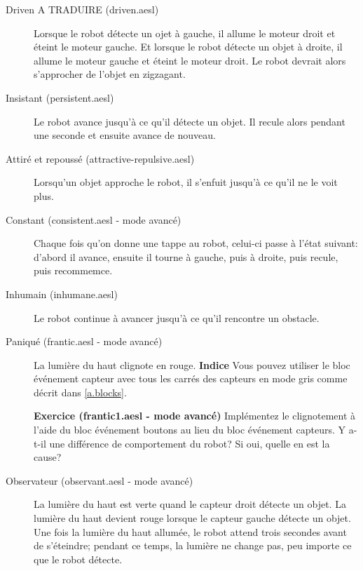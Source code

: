 \begin{description}
\item[Driven A TRADUIRE (driven.aesl)]
Lorsque le robot détecte un ojet à gauche, il allume le moteur droit et éteint le moteur gauche.
Et lorsque le robot détecte un objet à droite, il allume le moteur gauche et éteint le moteur droit.
Le robot devrait alors s'approcher de l'objet en zigzagant.

\item[Insistant (persistent.aesl)]
Le robot avance jusqu'à ce qu'il détecte un objet.
Il recule alors pendant une seconde et ensuite avance de nouveau.

\item[Attiré et repoussé (attractive-repulsive.aesl)]
Lorsqu'un objet approche le robot, il s'enfuit jusqu'à ce qu'il ne le voit plus.

\item[Constant (consistent.aesl - mode avancé)]
Chaque fois qu'on donne une tappe au robot, celui-ci passe à l'état suivant:
d'abord il avance, ensuite il tourne à gauche, puis à droite, puis recule, puis recommemce.

\item[Inhumain (inhumane.aesl)]
Le robot continue à avancer jusqu'à ce qu'il rencontre un obstacle.

\item[Paniqué (frantic.aesl - mode avancé)]
La lumière du haut clignote en rouge.
\textbf{Indice} Vous pouvez utiliser le bloc événement capteur avec tous les carrés des capteurs en mode gris comme décrit dans \cref{a.blocks}.

\textbf{Exercice (frantic1.aesl - mode avancé)}
Implémentez le clignotement à l'aide du bloc événement boutons au lieu du bloc événement capteurs.
Y a-t-il une différence de comportement du robot? Si oui, quelle en est la cause?

\item[Observateur (observant.aesl - mode avancé)]
La lumière du haut est verte quand le capteur droit détecte un objet.
La lumière du haut devient rouge lorsque le capteur gauche détecte un objet.
Une fois la lumière du haut allumée, le robot attend trois secondes avant de s'éteindre;
pendant ce temps, la lumière ne change pas, peu importe ce que le robot détecte.

\end{description}
